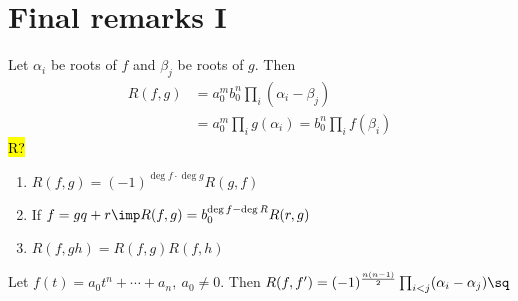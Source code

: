 \documentclass[a4paper]{article}
\begin{document}
\section{Final remarks I}
\begin{tdefinition}

\end{tdefinition}

\begin{tdefinition}[Resultant]

\end{tdefinition}

\begin{ttheorem}
  Let \( \alpha_i \) be roots of \( f \) and \( \beta_j \) be roots of \( g \).
  Then \begin{align*}
    R(f,g) &= a_0^m b_0^n \prod_i(\alpha_i-\beta_j) \\
    &= a_0^m \prod_i g(\alpha_i) = b_0^n \prod_i f(\beta_i)
  \end{align*} \hl{R?}
\end{ttheorem}

\begin{tcorollary}
  \begin{enumerate}
    \item \( R(f,g) = (-1)^{\deg f \cdot \deg g}R(g,f) \)
    \item If \( f = gq + r \imp R(f,g) = b_0^{\deg f - \deg R} R(r,g) \)
    \item \( R(f,gh) = R(f,g)R(f,h) \)
  \end{enumerate}
\end{tcorollary}

\begin{tcorollary}
  Let \( f(t) = a_0 t^{n} + \cdots + a_n,\ a_0\neq 0 \).
  Then \( R(f,f') = (-1)^{\frac{n(n-1)}{2}}\prod_{i<j}(\alpha_i-\alpha_j)\sq \)
\end{tcorollary}
\end{document}
